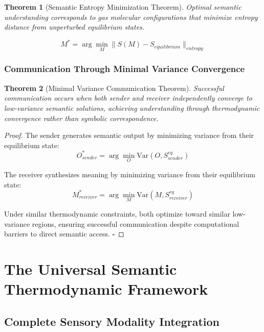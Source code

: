 \documentclass[11pt,a4paper]{article}
\newtheorem{theorem}{Theorem}[section]
\begin{document}
\begin{theorem}[Semantic Entropy Minimization Theorem]
Optimal semantic understanding corresponds to gas molecular configurations that minimize entropy distance from unperturbed equilibrium states.
\end{theorem}

\begin{equation}
M^* = \arg\min_{M} \|S(M) - S_{equilibrium}\|_{entropy}
\end{equation}

\subsubsection{Communication Through Minimal Variance Convergence}

\begin{theorem}[Minimal Variance Communication Theorem]
Successful communication occurs when both sender and receiver independently converge to low-variance semantic solutions, achieving understanding through thermodynamic convergence rather than symbolic correspondence.
\end{theorem}

\begin{proof}
The sender generates semantic output by minimizing variance from their equilibrium state:
\begin{equation}
O_{sender}^* = \arg\min_{O} \text{Var}(O, S_{sender}^{eq})
\end{equation}

The receiver synthesizes meaning by minimizing variance from their equilibrium state:
\begin{equation}
M_{receiver}^* = \arg\min_{M} \text{Var}(M, S_{receiver}^{eq})
\end{equation}

Under similar thermodynamic constraints, both optimize toward similar low-variance regions, ensuring successful communication despite computational barriers to direct semantic access. $\square$
\end{proof}

\section{The Universal Semantic Thermodynamic Framework}

\subsection{Complete Sensory Modality Integration}
\end{document}
